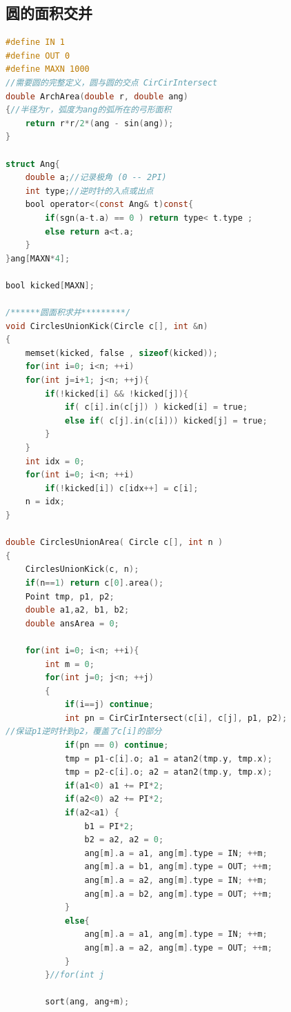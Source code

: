 \documentclass[UTF8,a4paper,titlepage]{ctexart}
\begin{document}
\subsection{圆的面积交并}
\begin{lstlisting}[language=C]
#define IN 1
#define OUT 0
#define MAXN 1000
//需要圆的完整定义，圆与圆的交点 CirCirIntersect
double ArchArea(double r, double ang)
{//半径为r，弧度为ang的弧所在的弓形面积
    return r*r/2*(ang - sin(ang));
}

struct Ang{
    double a;//记录极角 (0 -- 2PI)
    int type;//逆时针的入点或出点
    bool operator<(const Ang& t)const{
        if(sgn(a-t.a) == 0 ) return type< t.type ;
        else return a<t.a;
    }
}ang[MAXN*4];

bool kicked[MAXN];

/******圆面积求并*********/
void CirclesUnionKick(Circle c[], int &n)
{
    memset(kicked, false , sizeof(kicked));
    for(int i=0; i<n; ++i)
    for(int j=i+1; j<n; ++j){
        if(!kicked[i] && !kicked[j]){
            if( c[i].in(c[j]) ) kicked[i] = true;
            else if( c[j].in(c[i])) kicked[j] = true;
        }
    }
    int idx = 0;
    for(int i=0; i<n; ++i)
        if(!kicked[i]) c[idx++] = c[i];
    n = idx;
}

double CirclesUnionArea( Circle c[], int n )
{
    CirclesUnionKick(c, n);
    if(n==1) return c[0].area();
    Point tmp, p1, p2;
    double a1,a2, b1, b2;
    double ansArea = 0;

    for(int i=0; i<n; ++i){
        int m = 0;
        for(int j=0; j<n; ++j)
        {
            if(i==j) continue;
            int pn = CirCirIntersect(c[i], c[j], p1, p2);
//保证p1逆时针到p2，覆盖了c[i]的部分
            if(pn == 0) continue;
            tmp = p1-c[i].o; a1 = atan2(tmp.y, tmp.x);
            tmp = p2-c[i].o; a2 = atan2(tmp.y, tmp.x);
            if(a1<0) a1 += PI*2;
            if(a2<0) a2 += PI*2;
            if(a2<a1) {
                b1 = PI*2;
                b2 = a2, a2 = 0;
                ang[m].a = a1, ang[m].type = IN; ++m;
                ang[m].a = b1, ang[m].type = OUT; ++m;
                ang[m].a = a2, ang[m].type = IN; ++m;
                ang[m].a = b2, ang[m].type = OUT; ++m;
            }
            else{
                ang[m].a = a1, ang[m].type = IN; ++m;
                ang[m].a = a2, ang[m].type = OUT; ++m;
            }
        }//for(int j

        sort(ang, ang+m);


\end{lstlisting}
\end{document}
